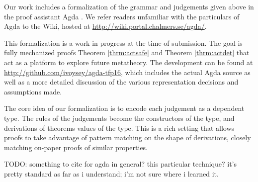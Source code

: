 Our work includes a formalization of the grammar and judgements given above
in the proof assistant Agda \cite{norell:thesis}. We refer readers
unfamiliar with the particulars of Agda to the Wiki, hosted
at \url{http://wiki.portal.chalmers.se/agda/}.

This formalization is a work in progress at the time of submission. The
goal is fully mechanized proofs Theorem \ref{thrm:actsafe} and
Theorem \ref{thrm:actdet} that act as a platform to explore future
metatheory. The development can be found at
\url{http://github.com/ivoysey/agda-tfp16}, which includes the actual Agda
source as well as a more detailed discussion of the various representation
decisions and assumptions made.

The core idea of our formalization is to encode each judgement as a
dependent type. The rules of the judgements become the constructors of the
type, and derivations of theorems values of the type. This is a rich
setting that allows proofs to take advantage of pattern matching on the
shape of derivations, closely matching on-paper proofs of similar
properties.


TODO: something to cite for agda in general? this particular technique?
it's pretty standard as far as i understand; i'm not sure where i learned
it.


